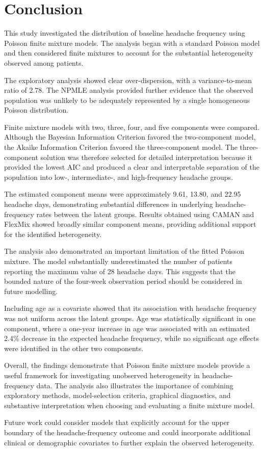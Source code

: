 
\section{Conclusion}
\label{sec:conclusion}

This study investigated the distribution of baseline headache
frequency using Poisson finite mixture models. The analysis began
with a standard Poisson model and then considered finite mixtures to
account for the substantial heterogeneity observed among patients.

The exploratory analysis showed clear over-dispersion, with a
variance-to-mean ratio of 2.78. The NPMLE analysis provided further
evidence that the observed population was unlikely to be adequately
represented by a single homogeneous Poisson distribution.

Finite mixture models with two, three, four, and five components were
compared. Although the Bayesian Information Criterion favored the
two-component model, the Akaike Information Criterion favored the
three-component model. The three-component solution was therefore
selected for detailed interpretation because it provided the lowest
AIC and produced a clear and interpretable separation of the
population into low-, intermediate-, and high-frequency headache
groups.

The estimated component means were approximately 9.61, 13.80, and
22.95 headache days, demonstrating substantial differences in
underlying headache-frequency rates between the latent groups.
Results obtained using CAMAN and FlexMix showed broadly similar
component means, providing additional support for the identified
heterogeneity.

The analysis also demonstrated an important limitation of the fitted
Poisson mixture. The model substantially underestimated the number of
patients reporting the maximum value of 28 headache days. This
suggests that the bounded nature of the four-week observation period
should be considered in future modelling.

Including age as a covariate showed that its association with
headache frequency was not uniform across the latent groups. Age was
statistically significant in one component, where a one-year increase
in age was associated with an estimated 2.4\% decrease in the
expected headache frequency, while no significant age effects were
identified in the other two components.

Overall, the findings demonstrate that Poisson finite mixture models
provide a useful framework for investigating unobserved heterogeneity
in headache-frequency data. The analysis also illustrates the
importance of combining exploratory methods, model-selection
criteria, graphical diagnostics, and substantive interpretation when
choosing and evaluating a finite mixture model.

Future work could consider models that explicitly account for the
upper boundary of the headache-frequency outcome and could
incorporate additional clinical or demographic covariates to further
explain the observed heterogeneity.